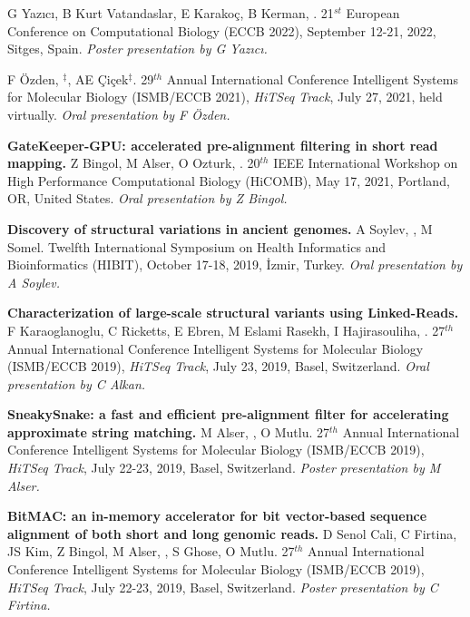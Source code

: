 \vspace{-.2cm}{\bf Identification of protein-protein interaction
bridges in multiple sclerosis.} G Yazıcı, B Kurt Vatandaslar, E Karakoç, B Kerman, \calkan{}.
21$^{st}$ European Conference on Computational Biology (ECCB 2022), September 12-21, 2022, Sitges, Spain. 
{\it Poster presentation by G Yazıcı.}

\vspace{-.2cm}{\bf Polishing copy number variant calls on exome sequencing data via deep learning.}
F Özden, \calkan{}$^\ddag$, AE Çiçek$^\ddag$. 29$^{th}$ Annual
International Conference Intelligent Systems for Molecular Biology (ISMB/ECCB 2021), {\em HiTSeq Track},
 July 27, 2021, held virtually. {\it Oral presentation by F Özden.}


\vspace{-.2cm}
{\bf GateKeeper-GPU: accelerated pre-alignment filtering in short read mapping.} Z Bingol, M Alser, O Ozturk, \calkan{}. 20$^{th}$ IEEE International Workshop on High Performance Computational Biology (HiCOMB), May 17, 2021, Portland, OR, United States.
{\it Oral presentation by Z Bingol.}


\clearpage

\vspace{-.2cm}
{\bf Discovery of structural variations in ancient genomes.}
A Soylev, \calkan{}, M Somel. 
Twelfth International Symposium on Health Informatics and Bioinformatics (HIBIT), October 17-18, 2019, İzmir, Turkey.
       {\it Oral presentation by A Soylev.}

       
       
\vspace{-.2cm}
  {\bf Characterization of large-scale structural variants using Linked-Reads.}
  F Karaoglanoglu, C Ricketts, E Ebren, M Eslami Rasekh, I Hajirasouliha, \calkan{}.
27$^{th}$ Annual
International Conference Intelligent Systems for Molecular Biology (ISMB/ECCB 2019), {\em HiTSeq Track},
 July 23, 2019, Basel, Switzerland. {\it Oral presentation by C Alkan.}




\vspace{-.2cm}
  {\bf SneakySnake: a fast and efficient pre-alignment filter for accelerating approximate string matching.}
  M Alser, \calkan{}, O Mutlu.
27$^{th}$ Annual
International Conference Intelligent Systems for Molecular Biology (ISMB/ECCB 2019), {\em HiTSeq Track},
 July 22-23, 2019, Basel, Switzerland. {\it Poster presentation by M Alser.}

\vspace{-.2cm}
   {\bf BitMAC: an in-memory accelerator for bit vector-based sequence alignment of both
short and long genomic reads.}
  D Senol Cali, C Firtina, JS Kim, Z Bingol, M Alser, \calkan{},
S Ghose, O Mutlu.
27$^{th}$ Annual
International Conference Intelligent Systems for Molecular Biology (ISMB/ECCB 2019), {\em HiTSeq Track},
 July 22-23, 2019, Basel, Switzerland. {\it Poster presentation by C Firtina.}

